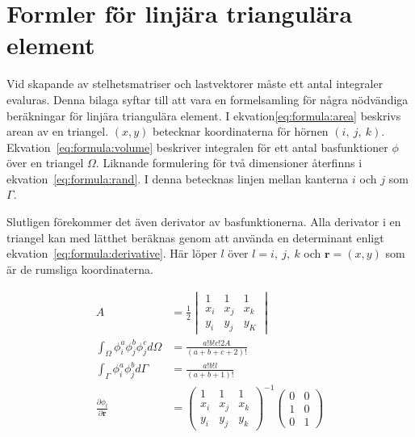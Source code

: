 \chapter{Formler för linjära triangulära element}
\label{sec:integrationformulae}


Vid skapande av stelhetsmatriser och lastvektorer måste ett antal integraler
evaluras. Denna bilaga syftar till att vara en formelsamling för några
nödvändiga beräkningar för linjära triangulära element. I ekvation\eqref{eq:formula:area} beskrivs arean av en triangel. $(x,y)$ betecknar koordinaterna
för hörnen $(i,~j,~k)$. Ekvation~\eqref{eq:formula:volume} beskriver integralen för ett
antal basfunktioner $\phi$ över en triangel $\Omega$. Liknande formulering för två dimensioner
återfinns i ekvation~\eqref{eq:formula:rand}. I denna betecknas linjen mellan kanterna
$i$ och $j$ som $\Gamma$.\cite{lewis04}

Slutligen förekommer det även derivator av basfunktionerna. Alla derivator i en triangel
kan med lätthet beräknas genom att använda en determinant enligt ekvation~\eqref{eq:formula:derivative}. Här löper $l$ över $l=i,~j,~k$ och $\mathbf{r} = (x,y)$ som är
de rumsliga koordinaterna.\cite{fem50}

\begin{align}
\label{eq:formula:area}
A &=
\frac{1}{2}
\begin{vmatrix}
1 & 1 & 1 \\
x_i & x_j & x_k \\
y_i & y_j & y_K
\end{vmatrix} \\
\label{eq:formula:volume}
\int_\Omega \phi^a_i\phi^b_j\phi^c_j d\Omega &=
\frac{a!b!c!2A}{(a+b+c+2)!} \\
\label{eq:formula:rand}
\int_\Gamma \phi^a_i \phi^b_j d\Gamma &=
\frac{a!b!l}{(a+b+1)!} \\
\label{eq:formula:derivative}
\frac{\partial \phi_l}{\partial \mathbf{r} } &=
\begin{pmatrix}
1 & 1 & 1 \\
x_i & x_j & x_k \\
y_i & y_j & y_k  
\end{pmatrix}^{-1}
\begin{pmatrix}
0 & 0 \\
1 & 0 \\
0 & 1
\end{pmatrix}
\end{align}

